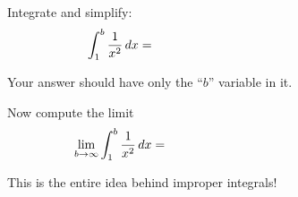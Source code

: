 Integrate and simplify:
    $$\int_1^b \frac{1}{x^2}\,dx= \hspace{2.5in}$$

\vspace{1.0in}\noindent
Your answer should have only the ``$b$'' variable in it.

\noindent
Now compute the limit
    $$\lim_{b\to\infty} \int_1^b \frac{1}{x^2}\,dx= \hspace{2.5in}$$

\vspace{1.0in}\noindent
This is the entire idea behind improper integrals!
